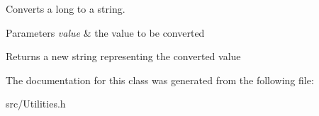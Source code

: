 Converts a long to a string. 


\begin{DoxyParams}{Parameters}
{\em value} & the value to be converted \\
\hline
\end{DoxyParams}
\begin{DoxyReturn}{Returns}
a new string representing the converted value 
\end{DoxyReturn}


The documentation for this class was generated from the following file\-:\begin{DoxyCompactItemize}
\item 
src/Utilities.\-h\end{DoxyCompactItemize}
